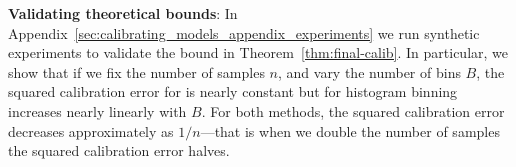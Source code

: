 \textbf{Validating theoretical bounds}: In Appendix~\ref{sec:calibrating_models_appendix_experiments} we run synthetic experiments to validate the bound in Theorem~\ref{thm:final-calib}. In particular, we show that if we fix the number of samples $n$, and vary the number of bins $B$, the squared calibration error for \ourcal{} is nearly constant but for histogram binning increases nearly linearly with $B$. For both methods, the squared calibration error decreases approximately as $1/n$---that is when we double the number of samples the squared calibration error halves.


